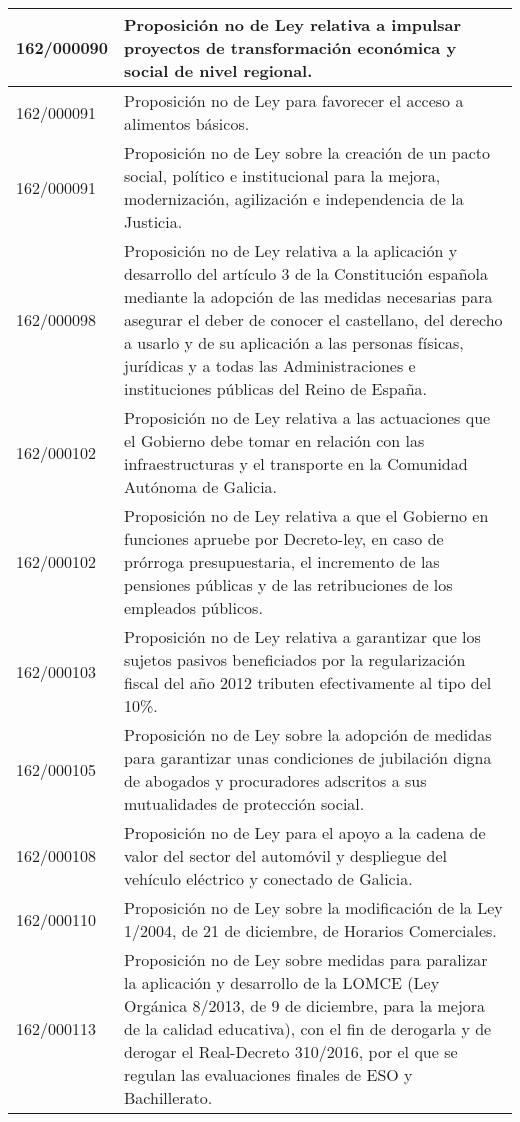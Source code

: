 {\begin{table}[H]
\begin{center}
\begin{tabularx}{\linewidth}{| l | X |}
\hline
162/000090 & Proposición no de Ley relativa a impulsar proyectos de transformación económica y social de nivel regional. \\
\hline
162/000091 & Proposición no de Ley para favorecer el acceso a alimentos básicos. \\
\hline
162/000091 & Proposición no de Ley sobre la creación de un pacto social, político e institucional para la mejora, modernización, agilización e independencia de la Justicia. \\
\hline
162/000098 & Proposición no de Ley relativa a la aplicación y desarrollo del artículo 3 de la Constitución española mediante la adopción de las medidas necesarias para asegurar el deber de conocer el castellano, del derecho a usarlo y de su aplicación a las personas físicas, jurídicas y a todas las Administraciones e instituciones públicas del Reino de España. \\
\hline
162/000102 & Proposición no de Ley relativa a las actuaciones que el Gobierno debe tomar en relación con las infraestructuras y el transporte en la Comunidad Autónoma de Galicia. \\
\hline
162/000102 & Proposición no de Ley relativa a que el Gobierno en funciones apruebe por Decreto-ley, en caso de prórroga presupuestaria, el incremento de las pensiones públicas y de las retribuciones de los empleados públicos. \\
\hline
162/000103 & Proposición no de Ley relativa a garantizar que los sujetos pasivos beneficiados por la regularización fiscal del año 2012 tributen efectivamente al tipo del 10\%. \\
\hline
162/000105 & Proposición no de Ley sobre la adopción de medidas para garantizar unas condiciones de jubilación digna de abogados y procuradores adscritos a sus mutualidades de protección social. \\
\hline
162/000108 & Proposición no de Ley para el apoyo a la cadena de valor del sector del automóvil y despliegue del vehículo eléctrico y conectado de Galicia. \\
\hline
162/000110 & Proposición no de Ley sobre la modificación de la Ley 1/2004, de 21 de diciembre, de Horarios Comerciales. \\
\hline
162/000113 & Proposición no de Ley sobre medidas para paralizar la aplicación y desarrollo de la LOMCE (Ley Orgánica 8/2013, de 9 de diciembre, para la mejora de la calidad educativa), con el fin de derogarla y de derogar el Real-Decreto 310/2016, por el que se regulan las evaluaciones finales de ESO y Bachillerato. \\

\end{tabularx}
\end{center}
\end{table}}
